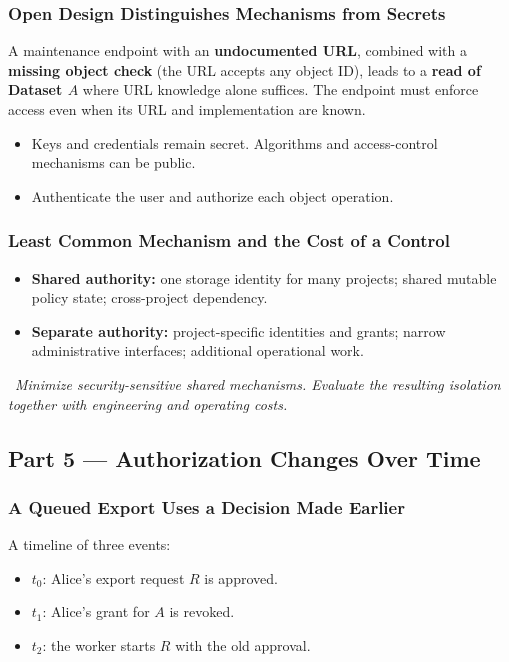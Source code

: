 \documentclass[hidelinks]{article}
\newcommand{\callout}[1]{\par\smallskip\noindent{\color{capri}$\blacktriangleright$}\ \textit{#1}\par\smallskip}
\begin{document}
\subsubsection{Open Design Distinguishes Mechanisms from Secrets}

A maintenance endpoint with an \textbf{undocumented URL}, combined with a \textbf{missing object check} (the URL accepts any object ID), leads to a \textbf{read of Dataset $A$} where URL knowledge alone suffices. The endpoint must enforce access even when its URL and implementation are known.
\begin{itemize}
    \item Keys and credentials remain secret. Algorithms and access-control mechanisms can be public.
    \item Authenticate the user and authorize each object operation.
\end{itemize}

\subsubsection{Least Common Mechanism and the Cost of a Control}

\begin{itemize}
    \item \textbf{Shared authority:} one storage identity for many projects; shared mutable policy state; cross-project dependency.
    \item \textbf{Separate authority:} project-specific identities and grants; narrow administrative interfaces; additional operational work.
\end{itemize}

\callout{Minimize security-sensitive shared mechanisms. Evaluate the resulting isolation together with engineering and operating costs.}

\subsection{Part 5 --- Authorization Changes Over Time}

\subsubsection{A Queued Export Uses a Decision Made Earlier}

A timeline of three events:
\begin{itemize}
    \item $t_0$: Alice's export request $R$ is approved.
    \item $t_1$: Alice's grant for $A$ is revoked.
    \item $t_2$: the worker starts $R$ with the old approval.
\end{itemize}
\end{document}
